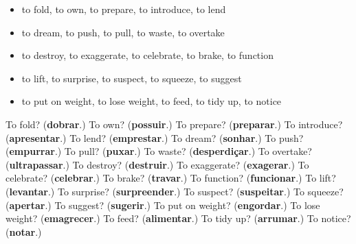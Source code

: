\begin{itemize}
\raggedright
  \item to fold, to own, to prepare, to introduce, to lend
  \item to dream, to push, to pull, to waste, to overtake
  \item to destroy, to exaggerate, to celebrate, to brake, to function
  \item to lift, to surprise, to suspect, to squeeze, to suggest
  \item to put on weight, to lose weight, to feed, to tidy up, to notice
\end{itemize}

\begin{tcolorbox}[breakable,colback=teal!4,colframe=teal!35!black,title={Before you move on}]
To fold? (\textbf{dobrar}.) To own? (\textbf{possuir}.) To prepare? (\textbf{preparar}.) To introduce? (\textbf{apresentar}.) To lend? (\textbf{emprestar}.) To dream? (\textbf{sonhar}.) To push? (\textbf{empurrar}.) To pull? (\textbf{puxar}.) To waste? (\textbf{desperdiçar}.) To overtake? (\textbf{ultrapassar}.) To destroy? (\textbf{destruir}.) To exaggerate? (\textbf{exagerar}.) To celebrate? (\textbf{celebrar}.) To brake? (\textbf{travar}.) To function? (\textbf{funcionar}.) To lift? (\textbf{levantar}.) To surprise? (\textbf{surpreender}.) To suspect? (\textbf{suspeitar}.) To squeeze? (\textbf{apertar}.) To suggest? (\textbf{sugerir}.) To put on weight? (\textbf{engordar}.) To lose weight? (\textbf{emagrecer}.) To feed? (\textbf{alimentar}.) To tidy up? (\textbf{arrumar}.) To notice? (\textbf{notar}.)
\end{tcolorbox}
